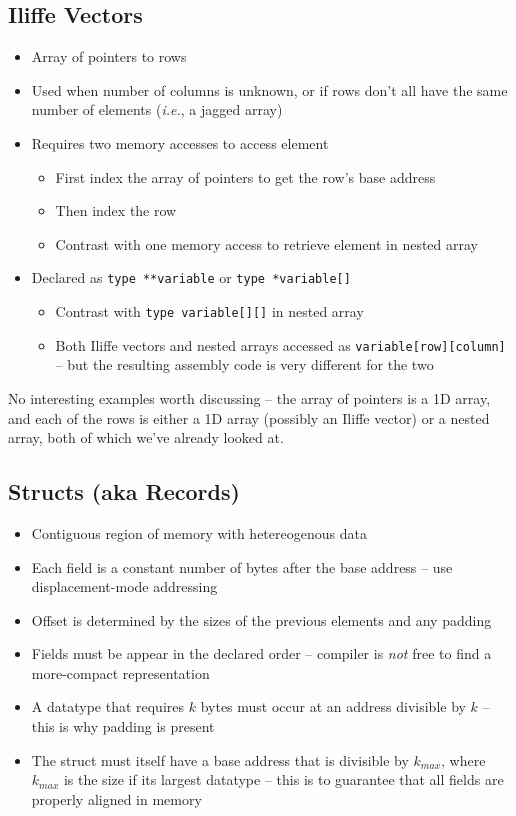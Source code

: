 \documentclass{article}
\begin{document}
\subsection{Iliffe Vectors}

\begin{itemize}
\item Array of pointers to rows
\item Used when number of columns is unknown, or if rows don't all have the same number of elements (\textit{i.e.}, a jagged array)
\item Requires two memory accesses to access element
    \begin{itemize}
    \item First index the array of pointers to get the row's base address
    \item Then index the row
    \item Contrast with one memory access to retrieve element in nested array
    \end{itemize}
\item Declared as \lstinline{type **variable} or \lstinline{type *variable[]}
    \begin{itemize}
    \item Contrast with \lstinline{type variable[][]} in nested array
    \item Both Iliffe vectors and nested arrays accessed as \lstinline{variable[row][column]} -- but the resulting assembly code is very different for the two
    \end{itemize}
\end{itemize}

No interesting examples worth discussing -- the array of pointers is a 1D array, and each of the rows is either a 1D array (possibly an Iliffe vector) or a nested array, both of which we've already looked at.

\subsection{Structs (aka Records)}

\begin{itemize}
\item Contiguous region of memory with hetereogenous data
\item Each field is a constant number of bytes after the base address -- use displacement-mode addressing
\item Offset is determined by the sizes of the previous elements and any padding
\item Fields must be appear in the declared order -- compiler is \textit{not} free to find a more-compact representation
\item A datatype that requires $k$ bytes must occur at an address divisible by $k$ -- this is why padding is present
\item The struct must itself have a base address that is divisible by $k_{max}$, where $k_{max}$ is the size if its largest datatype -- this is to guarantee that all fields are properly aligned in memory
\end{itemize}
\end{document}
